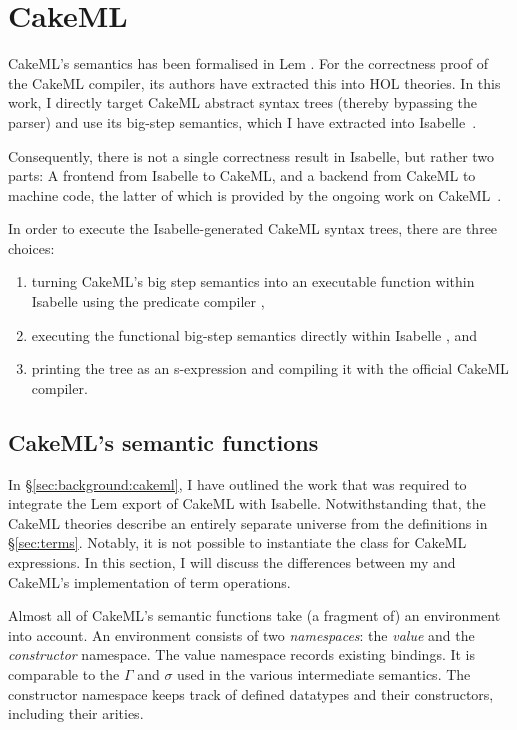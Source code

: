 
\section{CakeML}
\label{sec:intermediate:cakeml}

CakeML's semantics has been formalised in Lem \cite{mulligan2014lem}.
For the correctness proof of the CakeML compiler, its authors have extracted this into HOL theories.
In this work, I directly target CakeML abstract syntax trees (thereby bypassing the parser) and use its big-step semantics, which I have extracted into Isabelle~\cite{hupel2018cakeml}.

Consequently, there is not a single correctness result in Isabelle, but rather two parts:
A frontend from Isabelle to CakeML, and a backend from CakeML to machine code, the latter of which is provided by the ongoing work on CakeML~\cite{tan2016cakeml}.

In order to execute the Isabelle-generated CakeML syntax trees, there are three choices:
\begin{enumerate}
  \item
    turning CakeML's big step semantics into an executable function within Isabelle using the predicate compiler \cite{berghofer2009inductive},
  \item
    executing the functional big-step semantics directly within Isabelle \cite{owens2016functional}, and
  \item
    printing the tree as an s-expression and compiling it with the official CakeML compiler.%
\end{enumerate}

\subsection{CakeML's semantic functions}

In §\ref{sec:background:cakeml}, I have outlined the work that was required to integrate the Lem export of CakeML with Isabelle.
Notwithstanding that, the CakeML theories describe an entirely separate universe from the definitions in §\ref{sec:terms}.
Notably, it is not possible to instantiate the  class for CakeML expressions.
In this section, I will discuss the differences between my and CakeML's implementation of term operations.

Almost all of CakeML's semantic functions take (a fragment of) an environment into account.
An environment consists of two \emph{namespaces}: the \emph{value} and the \emph{constructor} namespace.
The value namespace records existing bindings.
It is comparable to the $\Gamma$ and $\sigma$ used in the various intermediate semantics.
The constructor namespace keeps track of defined datatypes and their constructors, including their arities.

